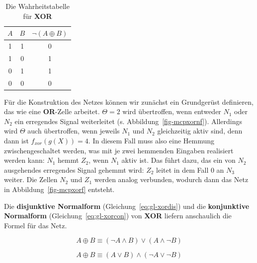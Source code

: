 {\begin{table} %
    \centering
    \begin{tabular}{c | c | c}
        $A$ & $B$ & $\neg(A \oplus B)$ \\
        \hline
        1   & 1   & 0           \\
        1   & 0   & 1           \\
        0   & 1   & 1           \\
        0   & 0   & 0           \\
    \end{tabular}
    \caption{Die Wahrheitstabelle für \textbf{XOR}}
    \label{tab:xor}
\end{table}


Für die Konstruktion des Netzes können wir zunächst ein Grundgerüst definieren, das wie eine \textbf{OR}-Zelle arbeitet. $\Theta = 2$ wird übertroffen, wenn entweder $N_1$ oder $N_2$ ein erregendes Signal weiterleitet (s. Abbildung~\ref{fig-mcpxornf}). Allerdings wird $\Theta$ auch übertroffen, wenn jeweils $N_1$ und $N_2$ gleichzeitig aktiv sind, denn dann ist $f_{xor}(g(X)) = 4$.
In diesem Fall muss also eine Hemmung zwischengeschaltet werden, was mit je zwei hemmenden Eingaben realisiert werden kann: $N_1$ hemmt $Z_2$, wenn $N_1$ aktiv ist.
Das führt dazu, das ein von $N_2$ ausgehendes erregendes Signal gehemmt wird: $Z_2$ leitet in dem Fall $0$ an $N_3$ weiter. Die Zellen $N_2$ und $Z_1$ werden analog verbunden, wodurch dann das Netz in Abbildung~\ref{fig-mcpxorf} entsteht.

Die \textbf{disjunktive Normalform} (Gleichung~\ref{eq:gl-xordis}) und die \textbf{konjunktive Normalform} (Gleichung~\ref{eq:gl-xorcon}) von \textbf{XOR} liefern anschaulich die Formel für das Netz.

\begin{equation}
A \oplus B \equiv (\neg A \land B) \lor (A \land \neg B)
\label{eq:gl-xordis}
\end{equation}

\begin{equation}
A \oplus B \equiv (A \lor B) \land (\neg A \lor \neg B)
\label{eq:gl-xorcon}
\end{equation}


}
